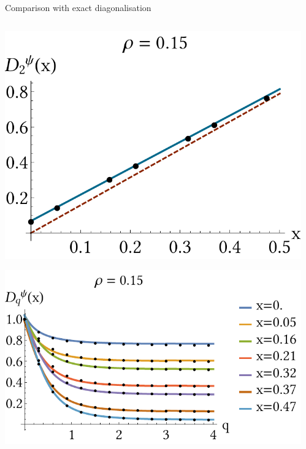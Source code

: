 \documentclass[xcolor=x11names,compress,professionalfonts]{beamer}
\renewcommand{\(}{\begin{columns}}
\renewcommand{\)}{\end{columns}}
\newcommand{\<}[1]{\begin{column}{#1}}
\renewcommand{\>}{\end{column}}
\begin{document}
\begin{frame}{Comparison with exact diagonalisation}
\begin{columns}
	\begin{column}{5cm}
		\centering
  		\includegraphics[scale=.4]{local_wf.pdf}
  		
  		\includegraphics[scale=.48]{individual_wf_dimensions.pdf}
	\end{column}
	\begin{column}{6cm}
		

\end{column}
\end{columns}
\end{frame}
\end{document}
